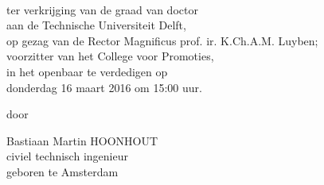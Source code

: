 \begin{titlepage}
  \begin{center}
    \hfill
    
    \vspace{2cm}
    
    \begingroup
    \color{Maroon} \\ \bigskip
    \endgroup
    
    \vfill
    
    
    \vfill
    
    ter verkrijging van de graad van doctor \\
    aan de Technische Universiteit Delft, \\
    op gezag van de Rector Magnificus prof. ir. K.Ch.A.M. Luyben; \\
    voorzitter van het College voor Promoties, \\
    in het openbaar te verdedigen op \\
    donderdag 16 maart 2016 om 15:00 uur.
    
    \vfill
    
    door
    
    \vfill
    
    Bastiaan Martin HOONHOUT \\
    civiel technisch ingenieur \\
    geboren te Amsterdam
    
    \vfill                      
    
  \end{center}  
\end{titlepage}

